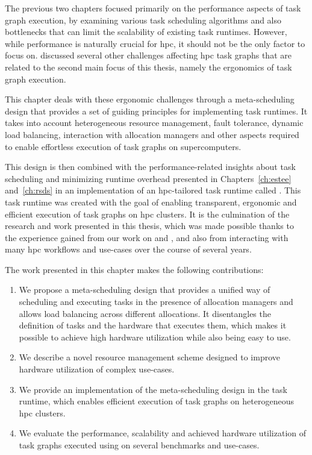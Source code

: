 The previous two chapters focused primarily on the performance aspects of task graph execution, by
examining various task scheduling algorithms and also bottlenecks that can limit the scalability of
existing task runtimes. However, while performance is naturally crucial for
\gls{hpc}, it should not be the only factor to focus on. 
discussed several other challenges affecting \gls{hpc} task graphs that are related
to the second main focus of this thesis, namely the ergonomics of task graph execution.

This chapter deals with these ergonomic challenges through a meta-scheduling design that provides a
set of guiding principles for implementing task runtimes. It takes into account heterogeneous
resource management, fault tolerance, dynamic load balancing, interaction with allocation managers
and other aspects required to enable effortless execution of task graphs on supercomputers.

This design is then combined with the performance-related insights about task scheduling and
minimizing runtime overhead presented in Chapters~\ref{ch:estee}
and~\ref{ch:rsds} in an implementation of an \gls{hpc}-tailored task
runtime called \hyperqueue{}. This task runtime was created with the goal of enabling
transparent, ergonomic and efficient execution of task graphs on \gls{hpc} clusters.
It is the culmination of the research and work presented in this thesis, which was made possible
thanks to the experience gained from our work on \estee{} and
\rsds{}, and also from interacting with many \gls{hpc} workflows and
use-cases over the course of several years.

The work presented in this chapter makes the following contributions:
\begin{enumerate}
	\item We propose a meta-scheduling design that provides a unified way of scheduling and executing tasks
	      in the presence of allocation managers and allows load balancing across different allocations. It
	      disentangles the definition of tasks and the hardware that executes them, which makes it possible
	      to achieve high hardware utilization while also being easy to use.
	\item We describe a novel resource management scheme designed to improve hardware
		  utilization of complex use-cases.
	\item We provide an implementation of the meta-scheduling design in the \hyperqueue{} task
	      runtime, which enables efficient execution of task graphs on heterogeneous \gls{hpc}
	      clusters.
	\item We evaluate the performance, scalability and achieved hardware utilization of task graphs executed
	      using \hyperqueue{} on several benchmarks and use-cases.
\end{enumerate}

